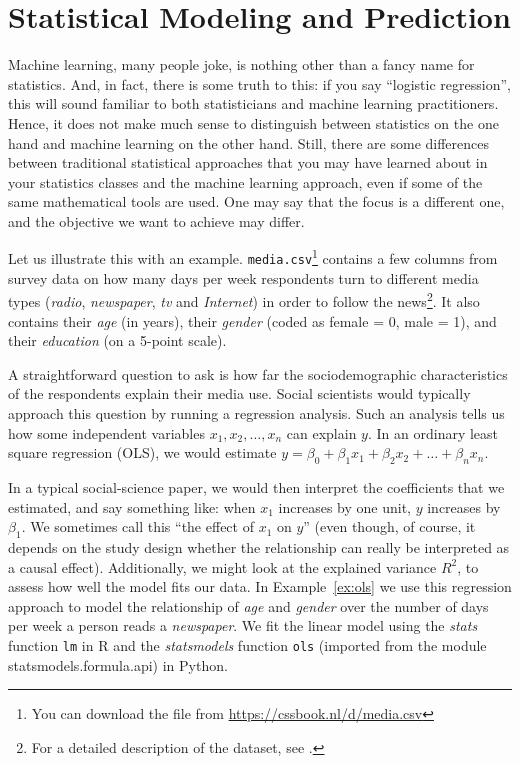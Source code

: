 \section{Statistical Modeling and Prediction}
\label{sec:prediction}
Machine learning, many people joke, is nothing other than a fancy name
for statistics.  And, in fact, there is some truth to this: if you say
``logistic regression'', this will sound familiar to both
statisticians and machine learning practitioners.  Hence, it does not
make much sense to distinguish between statistics on the one hand and
machine learning on the other hand.
Still, there are some differences between traditional statistical
approaches that you may have learned about in your statistics classes
and the machine learning approach, even if
some of the same
mathematical tools are used. One may say that  the focus is a different
one, and the objective we want to achieve may differ.

Let us illustrate this with an example.
\texttt{media.csv}\footnote{You can download the file from
  \url{https://cssbook.nl/d/media.csv}} contains a few columns from
survey data on how many days per week respondents turn to different
media types (\emph{radio}, \emph{newspaper}, \emph{tv} and \emph{Internet}) in order to follow the news\footnote{For a detailed
  description of the dataset, see \citet{Trilling2013phd}.}. It also
contains their \emph{age} (in years), their \emph{gender} (coded as female = 0, male = 1), and their \emph{education} (on a 5-point scale).

A straightforward question to ask is how far the
sociodemographic characteristics of the respondents explain their
media use.  Social scientists would typically approach this question
by running a regression analysis.  Such an analysis tells us how some
independent variables $x_1, x_2, \ldots, x_n$ can explain $y$.  In an
ordinary least square regression (OLS), we would estimate $y=\beta_0 +
\beta_1 x_1 + \beta_2 x_2 + \ldots + \beta_n x_n$.

In a typical social-science paper, we would then interpret the coefficients
that we estimated, and say something like: when $x_1$ increases by one unit,
$y$ increases by $\beta_1$.
We sometimes call this ``the effect of $x_1$ on $y$'' (even though, of course,
it depends on the study design whether the relationship can really be interpreted
as a causal effect).
Additionally, we might look at the explained variance $R^2$, to assess how well the model fits our data. In Example~\ref{ex:ols} we use this regression approach to model the relationship of \emph{age} and \emph{gender} over the number of days per week a person reads a \emph{newspaper}. We fit the linear model using the \emph{stats} function \texttt{lm} in R and the \emph{statsmodels} function \texttt{ols} (imported from the module statsmodels.formula.api) in Python.

